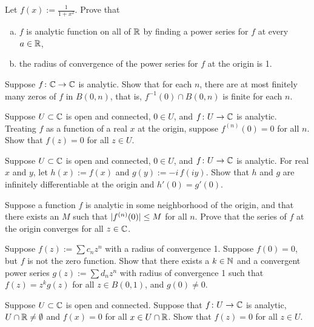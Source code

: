 \begin{exercise}
Let $f(x) := \frac{1}{1+x^2}$.  Prove that
\begin{enumerate}[a)]
\item
$f$ is analytic function on all of ${\mathbb{R}}$
by finding a power series for $f$ at every $a \in {\mathbb{R}}$,
\item
the radius of convergence of
the power series for $f$ at the origin is 1.
\end{enumerate}
\end{exercise}


\begin{exercise}
Suppose $f \colon {\mathbb{C}} \to {\mathbb{C}}$ is analytic.  Show that for each
$n$, there are at most finitely many zeros of $f$ in $B(0,n)$, that is,
$f^{-1}(0) \cap B(0,n)$ is finite for each $n$.
\end{exercise}

\begin{exercise}
Suppose $U \subset {\mathbb{C}}$ is open and connected, $0 \in U$, and $f \colon U
\to {\mathbb{C}}$ is analytic.  Treating $f$ as a function of a real $x$
at the origin, suppose $f^{(n)}(0) = 0$ for all $n$.  Show that $f(z) = 0$
for all $z \in U$.
\end{exercise}

\begin{exercise}
Suppose $U \subset {\mathbb{C}}$ is open and connected, $0 \in U$, and $f \colon U
\to {\mathbb{C}}$ is analytic.  For real $x$ and $y$,
let $h(x) := f(x)$ and $g(y) := -i \, f(iy)$.
Show that $h$ and $g$ are infinitely differentiable at the origin and
$h'(0) = g'(0)$.
\end{exercise}

\begin{exercise}
Suppose a function $f$ is analytic in some neighborhood of the origin,
and that there exists an $M$
such that $\lvert {f^{(n)}(0)} \rvert \leq M$ for all $n$.
Prove that the series of $f$ at the origin converges for all $z \in {\mathbb{C}}$.
\end{exercise}

\begin{exercise}
Suppose $f(z) := \sum c_n z^n$ with a radius of convergence 1.  Suppose $f(0)
= 0$, but $f$ is not the zero function.
Show that there exists a $k \in {\mathbb{N}}$ and a convergent
power series $g(z) := \sum d_n z^n$ with radius of convergence 1
such that $f(z) = z^k g(z)$ for all $z \in B(0,1)$, and $g(0) \not= 0$.
\end{exercise}

\begin{exercise}
Suppose $U \subset {\mathbb{C}}$ is open and connected.  Suppose that
$f \colon U \to {\mathbb{C}}$ is analytic, $U \cap {\mathbb{R}} \not= \emptyset$ and
$f(x) = 0$ for all $x \in U \cap {\mathbb{R}}$.  Show that $f(z) = 0$ for all $z \in
U$.
\end{exercise}

